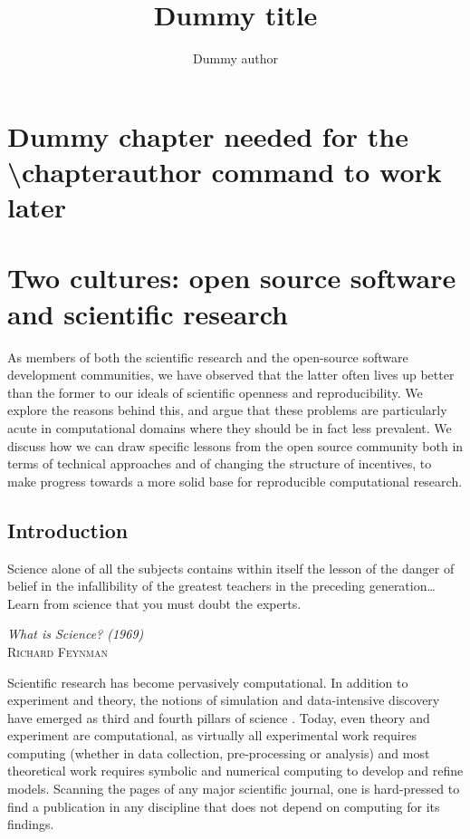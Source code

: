 \documentclass[ChapterTOCs,krantz2]{krantz} %
\begin{document}
\title{Dummy title}
\author{Dummy author}
\chapter*{Dummy chapter needed for the \textbackslash chapterauthor command to work later}

\mainmatter



\chapter{Two cultures: open source software and scientific research}

As members of both the scientific research and the open-source
software development communities, we have observed that the latter
often lives up better than the former to our ideals of scientific
openness and reproducibility.  We explore the reasons behind this,
and argue that these problems are particularly acute in computational
domains where they should be in fact less prevalent.   We discuss
how we can draw specific lessons from the open source community both
in terms of technical approaches and of changing the structure of
incentives, to make progress towards a more solid base for reproducible
computational research.

\section{Introduction}\label{intro}

\setlength{\epigraphrule}{0pt}
\setlength{\epigraphwidth}{.90\textwidth}
\epigraph%
{%
  Science alone of all the subjects contains within itself the lesson of the
  danger of belief in the infallibility of the greatest teachers in the
  preceding generation\ldots Learn from science that you must doubt the experts.
}%
{\textit{What is Science? (1969)}\\ \textsc{Richard Feynman} }

Scientific research has become pervasively computational. In addition
to experiment and theory, the notions of simulation and data-intensive
discovery have emerged as third and fourth pillars of science \cite{4th-paradigm}.
Today, even theory and experiment are computational, as virtually
all experimental work requires computing (whether in data collection,
pre-processing or analysis) and most theoretical work requires symbolic
and numerical computing to develop and refine models. Scanning the pages
of any major scientific journal, one is hard-pressed to find a publication
in any discipline that does not depend on computing for its findings.
\end{document}
